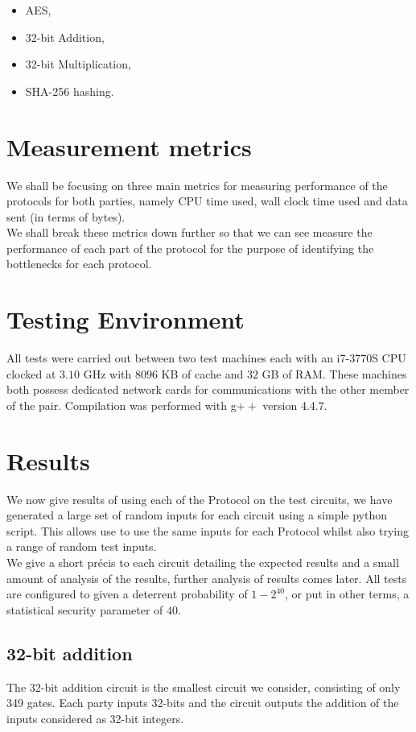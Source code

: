 \documentclass[ %
                    author={Nicholas Tutte},
                supervisor={Prof. Nigel Smart},
                    degree={MEng},
                     title={Secure Two Party Computation},
                  subtitle={A practical comparison of recent protocols},
                      type={Research - GG1K},
                      year={2015} ]{dissertation}
\begin{document}
		\begin{itemize}
			\item AES,
			\item 32-bit Addition,
			\item 32-bit Multiplication,
			\item SHA-256 hashing.
		\end{itemize}


		\section{Measurement metrics}
			We shall be focusing on three main metrics for measuring performance of the protocols for both parties, namely CPU time used, wall clock time used and data sent (in terms of bytes).\\

			We shall break these metrics down further so that we can see measure the performance of each part of the protocol for the purpose of identifying the bottlenecks for each protocol.

		\section{Testing Environment}
			All tests were carried out between two test machines each with an i7-3770S CPU clocked at $3.10$ GHz with $8096$ KB of cache and $32$ GB of RAM. These machines both possess dedicated network cards for communications with the other member of the pair. Compilation was performed with g$++$ version 4.4.7. 

		\section{Results}
			We now give results of using each of the Protocol on the test circuits, we have generated a large set of random inputs for each circuit using a simple python script. This allows use to use the same inputs for each Protocol whilst also trying a range of random test inputs.\\
			
			We give a short précis to each circuit detailing the expected results and a small amount of analysis of the results, further analysis of results comes later. All tests are configured to given a deterrent probability of $1 - 2^{40}$, or put in other terms, a statistical security parameter of $40$.

			\subsection{32-bit addition}
				The 32-bit addition circuit is the smallest circuit we consider, consisting of only 349 gates. Each party inputs 32-bits and the circuit outputs the addition of the inputs considered as 32-bit integers.\\
\end{document}
